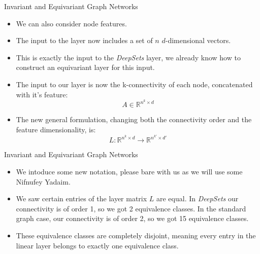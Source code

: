 \documentclass{beamer}
\begin{document}
\begin{frame}{Invariant and Equivariant Graph Networks}
    \begin{itemize}
        \setlength{\itemsep}{\fill}
        \item We can also consider node features.
        \pause
        \item The input to the layer now includes a set of $n$ $d$-dimensional vectors.
        \pause
        \item This is exactly the input to the \emph{DeepSets} layer, we already know how to construct an equivariant layer for this input.
        \pause
        \item The input to our layer is now the k-connectivity of each node, concatenated with it's feature:
        \[ A \in \mathbb{R}^{n^k \times d} \]
        \pause
        \item The new general formulation, changing both the connectivity order and the feature dimensionality, is:
        \[ L: \mathbb{R}^{n^k \times d} \rightarrow \mathbb{R}^{n^{k'} \times d'} \]
    \end{itemize}
\end{frame}
\begin{frame}{Invariant and Equivariant Graph Networks}
    \begin{itemize}
        \setlength{\itemsep}{\fill}
        \item We intoduce some new notation, please bare with us as we will use some Nifnufey Yadaim.
        \pause
        \item We saw certain entries of the layer matrix $L$ are equal.
        In \emph{DeepSets} our connectivity is of order 1, so we got 2 equivalence classes.
        In the standard graph case, our connectivity is of order 2, so we got 15 equivalence classes.
        \item These equivalence classes are completely disjoint, meaning every entry in the linear layer belongs to exactly one equivalence class.
    \end{itemize}
\end{frame}
\end{document}
